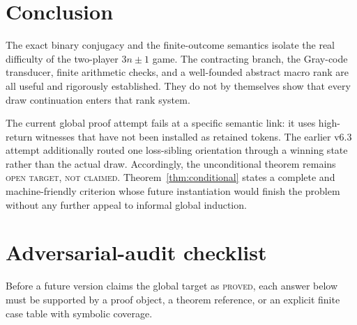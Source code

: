 \documentclass[11pt]{article}
\theoremstyle{definition}
\newcommand{\proved}{\textsc{proved}}
\newcommand{\openstatus}{\textsc{open target, not claimed}}
\begin{document}
\section{Conclusion}

The exact binary conjugacy and the finite-outcome semantics isolate the real
difficulty of the two-player $3n\pm1$ game.  The contracting branch, the
Gray-code transducer, finite arithmetic checks, and a well-founded abstract
macro rank are all useful and rigorously established.  They do not by
themselves show that every draw continuation enters that rank system.

The current global proof attempt fails at a specific semantic link: it uses
high-return witnesses that have not been installed as retained tokens.  The
earlier v6.3 attempt additionally routed one loss-sibling orientation through
a winning state rather than the actual draw.  Accordingly, the unconditional
theorem remains \openstatus.  Theorem~\ref{thm:conditional} states a complete and
machine-friendly criterion whose future instantiation would finish the
problem without any further appeal to informal global induction.

\appendix
\section{Adversarial-audit checklist}

Before a future version claims the global target as \proved, each answer
below must be supported by a proof object, a theorem
reference, or an explicit finite case table with symbolic coverage.
\end{document}
